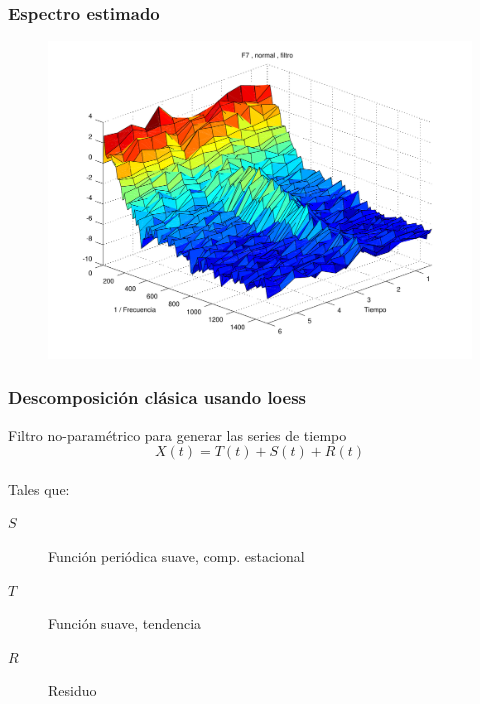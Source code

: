 \documentclass[11pt]{beamer}
\begin{document}
%
%


\begin{frame}[fragile]\frametitle{Espectro estimado}
\begin{figure}
\centering
\includegraphics[width=\linewidth]{./img_old/n7f.pdf} 
\end{figure}
\end{frame}


\begin{frame}\frametitle{Descomposición cl\'asica usando loess}

Filtro no-param\'etrico para generar las series de tiempo
\begin{equation*}
X(t) = T(t) + S(t) + R(t)
\end{equation*}\\

Tales que:\\
\begin{description}
\item[$S$] Función peri\'odica suave, comp. estacional
\item[$T$] Función suave, tendencia
\item[$R$] Residuo
\end{description}

\end{frame}
\end{document}
